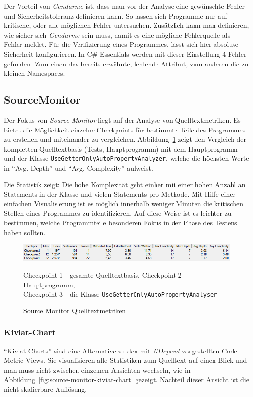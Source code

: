 Der Vorteil von \emph{Gendarme} ist, dass man vor der Analyse eine gewünschte Fehler- und Sicherheitstoleranz definieren kann. So lassen sich Programme nur auf kritische, oder alle möglichen Fehler untersuchen. Zusätzlich kann man definieren, wie sicher sich \emph{Gendarme} sein muss, damit es eine mögliche Fehlerquelle als Fehler meldet. Für die Verifizierung eines Programmes, lässt sich hier absolute Sicherheit konfigurieren. In C\# Essentials werden mit dieser Einstellung 4 Fehler gefunden. Zum einen das bereits erwähnte, fehlende Attribut, zum anderen die zu kleinen Namespaces.

\subsection{SourceMonitor}
Der Fokus von \emph{Source Monitor} liegt auf der Analyse von Quelltextmetriken. Es bietet die Möglichkeit einzelne Checkpoints für bestimmte Teile des Programmes zu erstellen und miteinander zu vergleichen. Abbildung~\ref{fig:source-monitor-avg-complexity} zeigt den Vergleich der kompletten Quelltextbasis (Tests, Hauptprogramm) mit dem Hauptprogramm und der Klasse \texttt{UseGetterOnlyAutoPropertyAnalyzer}, welche die höchsten Werte in \enquote{Avg. Depth} und \enquote{Avg. Complexity} aufweist.

Die Statistik zeigt: Die hohe Komplexität geht einher mit einer hohen Anzahl an Statements in der Klasse und vielen Statements pro Methode. Mit Hilfe einer einfachen Visualisierung ist es möglich innerhalb weniger Minuten die kritischen Stellen eines Programmes zu identifizieren. Auf diese Weise ist es leichter zu bestimmen, welche Programmteile besonderen Fokus in der Phase des Testens haben sollten.

\begin{figure}[!ht]
	\centering
	\includegraphics[width=\textwidth]{images/source-monitor-avg-complexity.png}
	\caption{Source Monitor Quelltextmetriken}
	\vspace{0.1cm}
	Checkpoint 1 - gesamte Quelltextbasis, Checkpoint 2 - Hauptprogramm,\\ Checkpoint 3 - die Klasse \texttt{UseGetterOnlyAutoPropertyAnalyser}
	\label{fig:source-monitor-avg-complexity}
\end{figure}

\subsubsection{Kiviat-Chart}
\enquote{Kiviat-Charts} sind eine Alternative zu den mit \emph{NDepend} vorgestellten Code-Metric-Views. Sie visualisieren alle Statistiken zum Quelltext auf einen Blick und man muss nicht zwischen einzelnen Ansichten wechseln, wie in Abbildung~\ref{fig:source-monitor-kiviat-chart} gezeigt. Nachteil dieser Ansicht ist die nicht skalierbare Auflösung.

